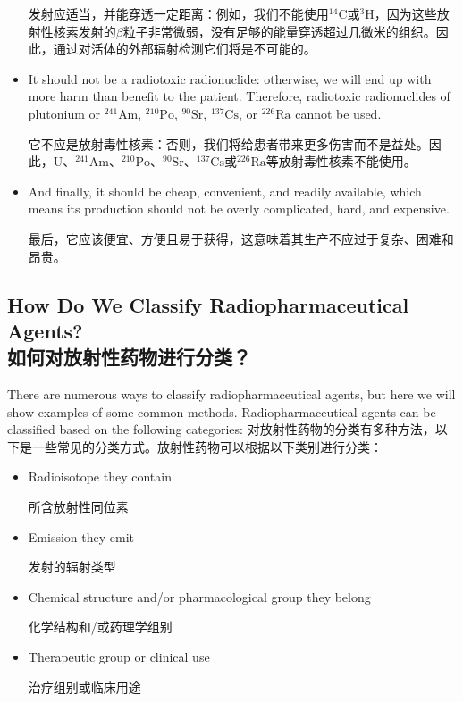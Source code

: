 \documentclass[dvipsnames, svgnames,a4paper,11pt]{article}
\begin{document}
\begin{itemize}
            发射应适当，并能穿透一定距离：例如，我们不能使用${}^\text{14}\text{C}$或${}^\text{3}\text{H}$，因为这些放射性核素发射的$\beta$粒子非常微弱，没有足够的能量穿透超过几微米的组织。因此，通过对活体的外部辐射检测它们将是不可能的。

      \item It should not be a radiotoxic radionuclide: otherwise, we will end up with more harm than benefit to the patient. Therefore, radiotoxic radionuclides of plutonium or ${}^\text{241}\text{Am}$, ${}^\text{210}\text{Po}$, ${}^\text{90}\text{Sr}$, ${}^\text{137}\text{Cs}$, or ${}^\text{226}\text{Ra}$ cannot be used.

            它不应是放射毒性核素：否则，我们将给患者带来更多伤害而不是益处。因此，U、${}^\text{241}\text{Am}$、${}^\text{210}\text{Po}$、${}^\text{90}\text{Sr}$、${}^\text{137}\text{Cs}$或${}^\text{226}\text{Ra}$等放射毒性核素不能使用。


      \item And finally, it should be cheap, convenient, and readily available, which means its production should not be overly complicated, hard, and expensive.

            最后，它应该便宜、方便且易于获得，这意味着其生产不应过于复杂、困难和昂贵。


\end{itemize}

\subsection{How Do We Classify Radiopharmaceutical Agents?\\如何对放射性药物进行分类？}

There are numerous ways to classify radiopharmaceutical agents, but here we will show examples of some common methods. Radiopharmaceutical agents can be classified based on the following categories:
对放射性药物的分类有多种方法，以下是一些常见的分类方式。放射性药物可以根据以下类别进行分类：

\begin{itemize}


      \item Radioisotope they contain

            所含放射性同位素

      \item Emission they emit

            发射的辐射类型

      \item Chemical structure and/or pharmacological group they belong

            化学结构和/或药理学组别

      \item Therapeutic group or clinical use

            治疗组别或临床用途

\end{itemize}
\end{document}
